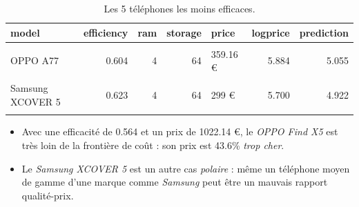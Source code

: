 \documentclass[
  12pt,
]{report}
\begin{document}
\begin{table}[!h]

\caption{\label{tab:worst}Les 5 téléphones les moins efficaces.}
\centering
\begin{tabular}[t]{lrrrlrr}
\toprule
\textbf{model} & \textbf{efficiency} & \textbf{ram} & \textbf{storage} & \textbf{price} & \textbf{logprice} & \textbf{prediction}\\
\midrule
\cellcolor{gray!6}{MOTOROLA Razr} & \cellcolor{gray!6}{0.600} & \cellcolor{gray!6}{8} & \cellcolor{gray!6}{256} & \cellcolor{gray!6}{853.6 €} & \cellcolor{gray!6}{6.749} & \cellcolor{gray!6}{5.909}\\
OPPO A77 & 0.604 & 4 & 64 & 359.16 € & 5.884 & 5.055\\
\cellcolor{gray!6}{OPPO Find X5} & \cellcolor{gray!6}{0.605} & \cellcolor{gray!6}{8} & \cellcolor{gray!6}{256} & \cellcolor{gray!6}{1022.14 €} & \cellcolor{gray!6}{6.930} & \cellcolor{gray!6}{6.102}\\
Samsung XCOVER 5 & 0.623 & 4 & 64 & 299 € & 5.700 & 4.922\\
\cellcolor{gray!6}{Samsung Galaxy S22+} & \cellcolor{gray!6}{0.628} & \cellcolor{gray!6}{8} & \cellcolor{gray!6}{128} & \cellcolor{gray!6}{1000.33 €} & \cellcolor{gray!6}{6.908} & \cellcolor{gray!6}{6.142}\\
\bottomrule
\end{tabular}
\end{table}

\newpage

\begin{itemize}
\item
  Avec une efficacité de 0.564 et un prix de 1022.14 €, le \emph{OPPO
  Find X5} est très loin de la frontière de coût : son prix est 43.6\%
  \emph{trop cher}.
\item
  Le \emph{Samsung XCOVER 5} est un autre cas \emph{polaire} : même un
  téléphone moyen de gamme d'une marque comme \emph{Samsung} peut être
  un mauvais rapport qualité-prix.
\end{itemize}
\end{document}
